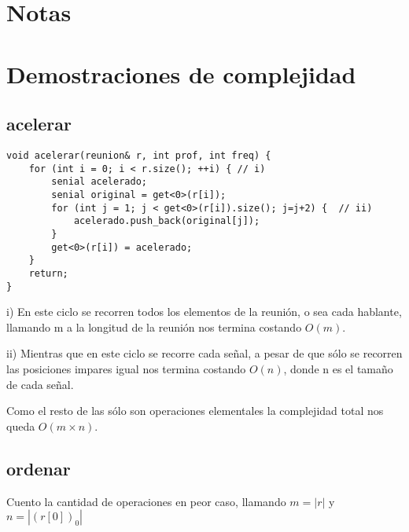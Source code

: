 \documentclass{article}
\begin{document}
\maketitle

\tableofcontents
\newpage



\section*{Notas}
\vspace{0.5cm}


\newpage
{}
\section*{Demostraciones de complejidad}
\vspace{0.5cm}
\subsection{acelerar}
\begin{lstlisting}
void acelerar(reunion& r, int prof, int freq) {
    for (int i = 0; i < r.size(); ++i) { // i)
        senial acelerado;
        senial original = get<0>(r[i]);
        for (int j = 1; j < get<0>(r[i]).size(); j=j+2) {  // ii)
            acelerado.push_back(original[j]);
        }
        get<0>(r[i]) = acelerado;
    }
    return; 
}
\end{lstlisting}
i) En este ciclo se recorren todos los elementos de la reunión, o sea cada hablante, llamando m a la longitud de la reunión nos termina costando $O(m)$.

ii) Mientras que en este ciclo se recorre cada señal, a pesar de que sólo se recorren las posiciones impares igual nos termina costando $O(n)$, donde n es el tamaño de cada señal.

Como el resto de las sólo son operaciones elementales la complejidad total nos queda $O(m \times n)$.

\subsection{ordenar}
Cuento la cantidad de operaciones en peor caso, llamando $m=|r|$ y $n=|(r[0])_0|$
\end{document}
